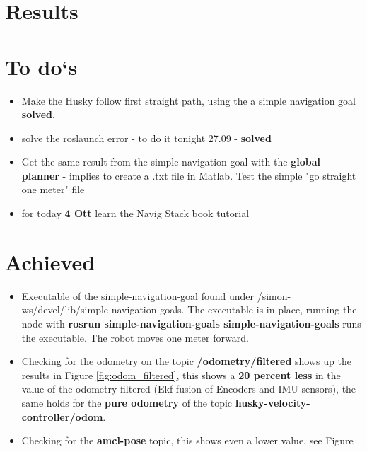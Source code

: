 \documentclass[11pt,a4paper]{article}
\begin{document}

%
%



\section{Results} \label{sec:res}




\section{To do`s} \label{sec:todos}
\begin{itemize}
\item Make the Husky follow first straight path, using the a simple navigation goal \textbf{solved}. 
\item solve the roslaunch error - to do it tonight 27.09 - \textbf{solved}
\item Get the same result from the simple-navigation-goal with the \textbf{global planner} - implies to create a .txt file in Matlab. Test the simple "go straight one meter" file
\item for today \textbf{4 Ott} learn the Navig Stack book tutorial
\end{itemize}


\section{Achieved}

\begin{itemize}
\item Executable of the simple-navigation-goal found under /simon-ws/devel/lib/simple-navigation-goals. The executable is in place, running the node with \textbf{rosrun simple-navigation-goals simple-navigation-goals} runs the executable. The robot moves one meter forward. 
\item Checking for the odometry on the topic \textbf{/odometry/filtered} shows up the results in Figure \ref{fig:odom_filtered}, this shows a \textbf{20 percent less} in the value of the odometry filtered (Ekf fusion of Encoders and IMU sensors), the same holds for the \textbf{pure odometry} of the topic \textbf{husky-velocity-controller/odom}. 
\item Checking for the \textbf{amcl-pose} topic, this shows even a lower value, see Figure 


\end{itemize}
\end{document}
